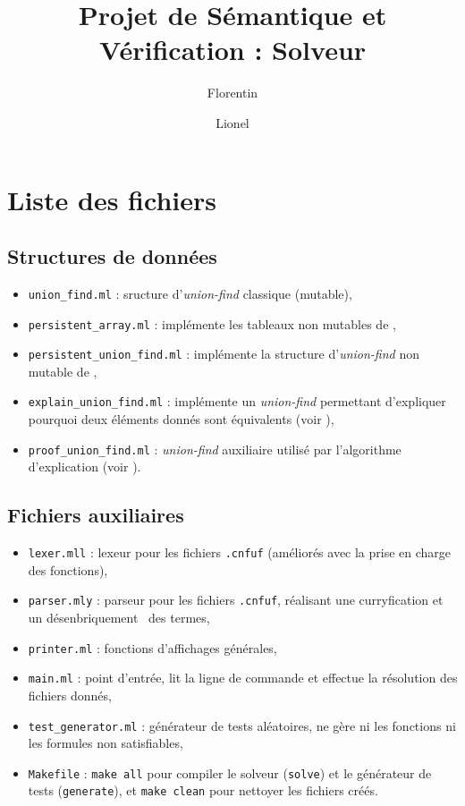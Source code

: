 \documentclass[a4paper, 10pt, french]{article}
\title{Projet de Sémantique et Vérification : Solveur \foreign{SMT}}
\author{Florentin \bsc{Guth} \and Lionel \bsc{Zoubritzky}}
\newcommand{\code}[1]{\texttt{#1}}
\newcommand{\foreign}[1]{\emph{#1}}
\begin{document}
\maketitle


\tableofcontents


\section{Liste des fichiers}

\subsection{Structures de données}

\begin{itemize}
 \item \code{union\string_find.ml} : sructure d'\foreign{union-find} classique 
(mutable),
 \item \code{persistent\string_array.ml} : implémente les tableaux non mutables 
de \cite{PersistentUF},
 \item \code{persistent\string_union\string_find.ml} : implémente la structure 
d'\foreign{union-find} non mutable de \cite{PersistentUF},
\item \code{explain\string_union\string_find.ml} : implémente un 
\foreign{union-find} permettant d'expliquer pourquoi deux éléments donnés sont 
équivalents (voir \cite{ExplainUF}),
\item \code{proof\string_union\string_find.ml} : \foreign{union-find} 
auxiliaire utilisé par l'algorithme d'explication (voir \cite{ExplainUF}).
\end{itemize}

\subsection{Fichiers auxiliaires}

\begin{itemize}
 \item \code{lexer.mll} : lexeur pour les fichiers \code{.cnfuf} (améliorés 
avec la prise en charge des fonctions),
 \item \code{parser.mly} : parseur pour les fichiers \code{.cnfuf}, réalisant 
une curryfication et un \og désenbriquement \fg\ des termes,
 \item \code{printer.ml} : fonctions d'affichages générales,
 \item \code{main.ml} : point d'entrée, lit la ligne de commande et effectue la 
résolution des fichiers donnés,
 \item \code{test\string_generator.ml} : générateur de tests aléatoires, ne 
gère ni les fonctions ni les formules non satisfiables,
 \item \code{Makefile} : \code{make all} pour compiler le solveur 
(\code{solve}) et le générateur de tests (\code{generate}), et \code{make 
clean} pour nettoyer les fichiers créés.
\end{itemize}
\end{document}
